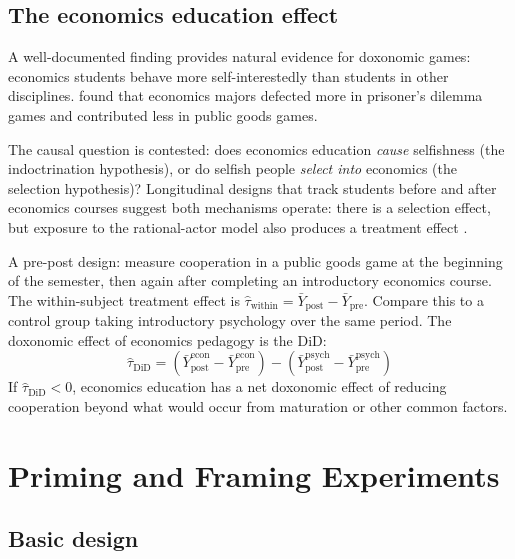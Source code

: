 \subsection{The economics education effect}

A well-documented finding provides natural evidence for doxonomic games: economics students behave more self-interestedly than students in other disciplines.
\textcite{frank1993} found that economics majors defected more in prisoner's dilemma games and contributed less in public goods games.

The causal question is contested: does economics education \emph{cause} selfishness (the indoctrination hypothesis), or do selfish people \emph{select into} economics (the selection hypothesis)?
Longitudinal designs that track students before and after economics courses suggest both mechanisms operate: there is a selection effect, but exposure to the rational-actor model also produces a treatment effect \autocite{bauman1996}.

\begin{example}
\label{ex:econ-education}
A pre-post design: measure cooperation in a public goods game at the beginning of the semester, then again after completing an introductory economics course.
The within-subject treatment effect is $\hat{\tau}_{\text{within}} = \bar{Y}_{\text{post}} - \bar{Y}_{\text{pre}}$.
Compare this to a control group taking introductory psychology over the same period.
The doxonomic effect of economics pedagogy is the DiD:
\[
  \hat{\tau}_{\text{DiD}} = (\bar{Y}^{\text{econ}}_{\text{post}} - \bar{Y}^{\text{econ}}_{\text{pre}}) - (\bar{Y}^{\text{psych}}_{\text{post}} - \bar{Y}^{\text{psych}}_{\text{pre}})
\]
If $\hat{\tau}_{\text{DiD}} < 0$, economics education has a net doxonomic effect of reducing cooperation beyond what would occur from maturation or other common factors.
\end{example}

\section{Priming and Framing Experiments}
\label{sec:ch19-priming}

\subsection{Basic design}

